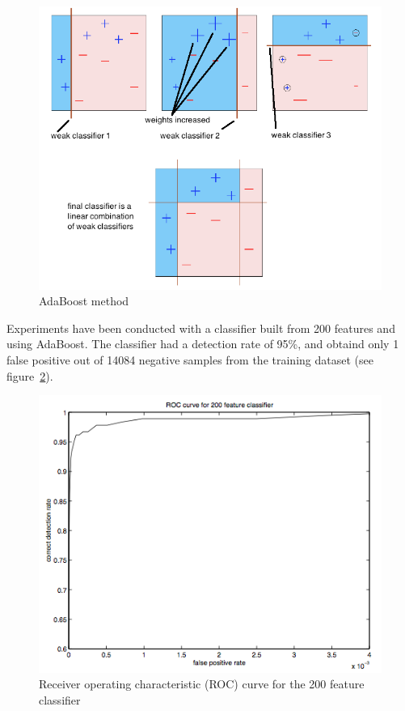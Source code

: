 \begin{figure}[!h]
\begin{center}
\noindent \includegraphics[scale=0.6]{figures/haar_feature_adaboost} 
\newline
\caption{AdaBoost method}
\label{haar_feature_adaboost}
\end{center} 
\end{figure}

\noindent Experiments have been conducted with a classifier built from 200 features and using AdaBoost. The classifier had a detection rate of 95\%, and obtaind only 1 false positive out of 14084 negative samples from the training dataset (see figure~\ref{haar_feature_example_result})\cite{VIO01}.
\newline

\begin{figure}[!h]
\begin{center}
\noindent \includegraphics[scale=0.8]{figures/haar_feature_example_result} 
\newline
\caption{Receiver operating characteristic (ROC) curve for the 200 feature classifier}
\label{haar_feature_example_result}
\end{center} 
\end{figure}


